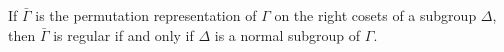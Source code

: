 If $\bar{\Gamma}$ is the permutation representation of $\Gamma$ on the right cosets of a subgroup $\Delta$, then $\bar{\Gamma}$ is regular if and only if $\Delta$ is a normal subgroup of $\Gamma$.
